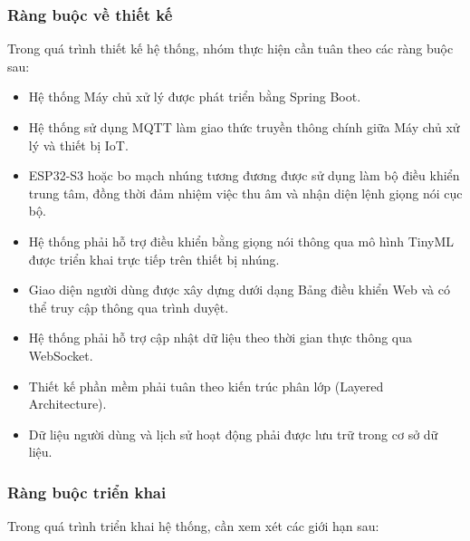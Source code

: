 \documentclass[a4paper,12pt]{article}
\begin{document}
\subsubsection{Ràng buộc về thiết kế}

Trong quá trình thiết kế hệ thống, nhóm thực hiện cần tuân theo các ràng buộc sau:

\begin{itemize}
\item Hệ thống Máy chủ xử lý được phát triển bằng Spring Boot.

\item Hệ thống sử dụng MQTT làm giao thức truyền thông chính giữa Máy chủ xử lý và thiết bị IoT.

\item ESP32-S3 hoặc bo mạch nhúng tương đương được sử dụng làm bộ điều khiển trung tâm, đồng thời đảm nhiệm việc thu âm và nhận diện lệnh giọng nói cục bộ.

\item Hệ thống phải hỗ trợ điều khiển bằng giọng nói thông qua mô hình TinyML được triển khai trực tiếp trên thiết bị nhúng.

\item Giao diện người dùng được xây dựng dưới dạng Bảng điều khiển Web và có thể truy cập thông qua trình duyệt.

\item Hệ thống phải hỗ trợ cập nhật dữ liệu theo thời gian thực thông qua WebSocket.

\item Thiết kế phần mềm phải tuân theo kiến trúc phân lớp (Layered Architecture).

\item Dữ liệu người dùng và lịch sử hoạt động phải được lưu trữ trong cơ sở dữ liệu.

\end{itemize}

\subsubsection{Ràng buộc triển khai}

Trong quá trình triển khai hệ thống, cần xem xét các giới hạn sau:
\end{document}
